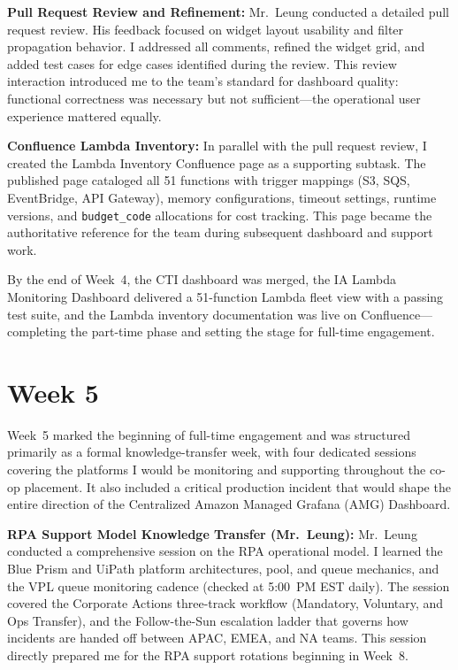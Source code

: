 \textbf{Pull Request Review and Refinement:} 
Mr.\ Leung conducted
a detailed pull request review. His feedback focused on widget layout usability and
filter propagation behavior. I addressed all comments, refined the
widget grid, and added test cases for edge cases identified during the
review. This review interaction introduced me to the team's standard for
dashboard quality: functional correctness was necessary but not
sufficient---the operational user experience mattered equally.

\textbf{Confluence Lambda Inventory:} 
In parallel with the
pull request review, I created the Lambda Inventory Confluence page as a supporting subtask. The published page cataloged all 51 functions
with trigger mappings (S3, SQS, EventBridge, API Gateway), memory
configurations, timeout settings, runtime versions, and \texttt{budget\_code}
allocations for cost tracking. This page became the authoritative
reference for the team during subsequent dashboard and support work.

By the end of Week~4, the CTI dashboard was merged, the IA Lambda Monitoring Dashboard
delivered a 51-function Lambda fleet view with a passing test suite, and
the Lambda inventory documentation was live on Confluence---completing
the part-time phase and setting the stage for full-time engagement.


\FloatBarrier

\section{Week 5}
\label{sec:week5}

Week~5 marked the beginning of full-time engagement and was structured
primarily as a formal knowledge-transfer week, with four dedicated sessions
covering the platforms I would be monitoring and supporting throughout the
co-op placement. It also included a critical production incident that would shape
the entire direction of the Centralized Amazon Managed Grafana (AMG) Dashboard.

\textbf{RPA Support Model Knowledge Transfer (Mr.\ Leung):} 
Mr.\ Leung conducted a comprehensive session on the RPA operational model. I learned the
Blue Prism and UiPath platform architectures, pool, and queue mechanics, and
the VPL queue monitoring cadence (checked at 5:00~PM EST daily). The session
covered the Corporate Actions three-track workflow (Mandatory, Voluntary, and
Ops Transfer), and the Follow-the-Sun escalation ladder that governs how
incidents are handed off between APAC, EMEA, and NA teams. This session directly
prepared me for the RPA support rotations beginning in Week~8.

